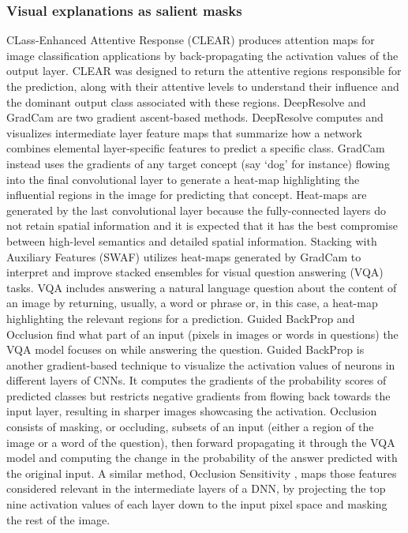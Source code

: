 \documentclass[final,1p,times]{elsarticle}
\begin{document}
\subsubsection{Visual explanations as salient masks}
CLass-Enhanced Attentive Response (CLEAR) \cite{kumar2017explaining} produces attention maps for image classification applications by back-propagating the activation values of the output layer. CLEAR was designed to return the attentive regions responsible for the prediction, along with their attentive levels to understand their influence and the dominant output class associated with these regions.
DeepResolve \cite{liu2017visualizing} and GradCam \cite{selvaraju2017grad} are two gradient ascent-based methods. DeepResolve computes and visualizes intermediate layer feature maps that summarize how a network combines elemental layer-specific features to predict a specific class. GradCam instead uses the gradients of any target concept (say `dog' for instance) flowing into the final convolutional layer to generate a heat-map highlighting the influential regions in the image for predicting that concept. Heat-maps are generated by the last convolutional layer because the fully-connected layers do not retain spatial information and it is expected that it has the best compromise between high-level semantics and detailed spatial information. 
Stacking with Auxiliary Features (SWAF) \cite{rajani2017using} utilizes heat-maps generated by GradCam to interpret and improve stacked ensembles for visual question answering (VQA) tasks. VQA includes answering a natural language question about the content of an image by returning, usually, a word or phrase or, in this case, a heat-map highlighting the relevant regions for a prediction. 
Guided BackProp and Occlusion \cite{goyal2016towards} find what part of an input (pixels in images or words in questions) the VQA model focuses on while answering the question.
Guided BackProp is another gradient-based technique to visualize the activation values of neurons in different layers of CNNs. It computes the gradients of the probability scores of predicted classes but restricts negative gradients from flowing back towards the input layer, resulting in sharper images showcasing the activation. Occlusion consists of masking, or occluding, subsets of an input (either a region of the image or a word of the question), then forward propagating it through the VQA model and computing the change in the probability of the answer predicted with the original input. A similar method, Occlusion Sensitivity \cite{zeiler2014visualizing}, maps those features considered relevant in the intermediate layers of a DNN, by projecting the top nine activation values of each layer down to the input pixel space and masking the rest of the image.
\end{document}
